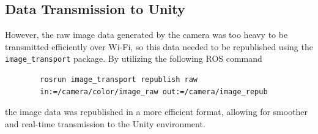     \subsection{Data Transmission to Unity} 
     
    However, the raw image data generated by the camera was too heavy to be transmitted efficiently over Wi-Fi, so this data needed to be republished using the \texttt{image\_transport} package.
    By utilizing the following \ac{ROS} command 
    \begin{verbatim}
        rosrun image_transport republish raw 
        in:=/camera/color/image_raw out:=/camera/image_repub
    \end{verbatim}
    the image data was republished in a more efficient format, allowing for smoother and real-time transmission to the Unity environment.
    

